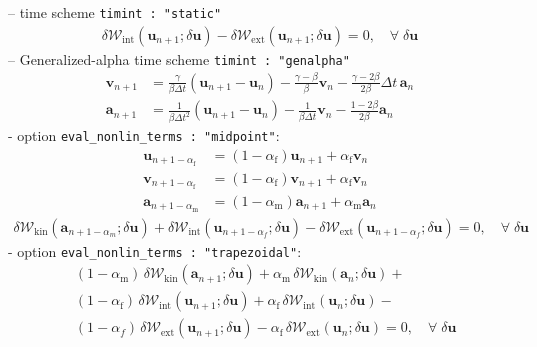 \documentclass[a4paper,12pt]{report}
\newcommand{\bs}[1]{\boldsymbol{#1}}
\begin{document}
-- time scheme \verb.timint : "static".\\
\begin{equation}
\begin{aligned}
\delta \mathcal{W}_{\mathrm{int}}(\bs{u}_{n+1};\delta\bs{u}) - \delta \mathcal{W}_{\mathrm{ext}}(\bs{u}_{n+1};\delta\bs{u}) = 0, \quad \forall \; \delta\bs{u}\end{aligned}
\end{equation}
-- Generalized-alpha time scheme \verb.timint : "genalpha".
\begin{equation}
\begin{aligned}
\bs{v}_{n+1} &= \frac{\gamma}{\beta\Delta t}(\bs{u}_{n+1}-\bs{u}_{n}) - \frac{\gamma-\beta}{\beta} \bs{v}_{n} - \frac{\gamma-2\beta}{2\beta}\Delta t\,\bs{a}_{n} \\
\bs{a}_{n+1} &= \frac{1}{\beta\Delta t^2}(\bs{u}_{n+1}-\bs{u}_{n}) - \frac{1}{\beta\Delta t} \bs{v}_{n} - \frac{1-2\beta}{2\beta}\bs{a}_{n}
\end{aligned}
\end{equation}
\quad - option \verb.eval_nonlin_terms : "midpoint".:
\begin{equation}
\label{equation-solid-midpoint-genalpha}
\begin{aligned}
\bs{u}_{n+1-\alpha_{\mathrm{f}}} &= (1-\alpha_{\mathrm{f}})\bs{u}_{n+1} + \alpha_{\mathrm{f}} \bs{v}_{n} \\
\bs{v}_{n+1-\alpha_{\mathrm{f}}} &= (1-\alpha_{\mathrm{f}})\bs{v}_{n+1} + \alpha_{\mathrm{f}} \bs{v}_{n} \\
\bs{a}_{n+1-\alpha_{\mathrm{m}}} &= (1-\alpha_{\mathrm{m}})\bs{a}_{n+1} + \alpha_{\mathrm{m}} \bs{a}_{n}
\end{aligned}
\end{equation}
\begin{equation}
\begin{aligned}
\delta \mathcal{W}_{\mathrm{kin}}(\bs{a}_{n+1-\alpha_{m}};\delta\bs{u}) + \delta \mathcal{W}_{\mathrm{int}}(\bs{u}_{n+1-\alpha_{f}};\delta\bs{u}) - \delta \mathcal{W}_{\mathrm{ext}}(\bs{u}_{n+1-\alpha_{f}};\delta\bs{u}) = 0, \quad \forall \; \delta\bs{u}\end{aligned}
\end{equation}
\quad - option \verb.eval_nonlin_terms : "trapezoidal".:
\begin{equation}
\begin{aligned}
&(1-\alpha_{\mathrm{m}})\,\delta \mathcal{W}_{\mathrm{kin}}(\bs{a}_{n+1};\delta\bs{u}) + \alpha_{\mathrm{m}}\,\delta \mathcal{W}_{\mathrm{kin}}(\bs{a}_{n};\delta\bs{u}) + \\
& (1-\alpha_{\mathrm{f}})\,\delta \mathcal{W}_{\mathrm{int}}(\bs{u}_{n+1};\delta\bs{u}) + \alpha_{\mathrm{f}}\,\delta \mathcal{W}_{\mathrm{int}}(\bs{u}_{n};\delta\bs{u}) - \\
& (1-\alpha_{f})\,\delta \mathcal{W}_{\mathrm{ext}}(\bs{u}_{n+1};\delta\bs{u}) - \alpha_{\mathrm{f}}\,\delta \mathcal{W}_{\mathrm{ext}}(\bs{u}_{n};\delta\bs{u}) = 0, \quad \forall \; \delta\bs{u}\end{aligned}
\end{equation}
\end{document}
